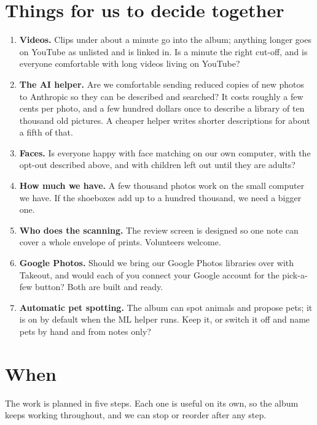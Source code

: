 \documentclass[11pt,a4paper]{article}
\begin{document}
\section{Things for us to decide together}

\begin{enumerate}[leftmargin=2em,itemsep=4pt]
  \item \textbf{Videos.} Clips under about a minute go into the album; anything longer goes on YouTube as unlisted and is linked in. Is a minute the right cut-off, and is everyone comfortable with long videos living on YouTube?
  \item \textbf{The AI helper.} Are we comfortable sending reduced copies of new photos to Anthropic so they can be described and searched? It costs roughly a few cents per photo, and a few hundred dollars once to describe a library of ten thousand old pictures. A cheaper helper writes shorter descriptions for about a fifth of that.
  \item \textbf{Faces.} Is everyone happy with face matching on our own computer, with the opt-out described above, and with children left out until they are adults?
  \item \textbf{How much we have.} A few thousand photos work on the small computer we have. If the shoeboxes add up to a hundred thousand, we need a bigger one.
  \item \textbf{Who does the scanning.} The review screen is designed so one note can cover a whole envelope of prints. Volunteers welcome.
  \item \textbf{Google Photos.} Should we bring our Google Photos libraries over with Takeout, and would each of you connect your Google account for the pick-a-few button? Both are built and ready.
  \item \textbf{Automatic pet spotting.} The album can spot animals and propose pets; it is on by default when the ML helper runs. Keep it, or switch it off and name pets by hand and from notes only?
\end{enumerate}


\section{When}

The work is planned in five steps. Each one is useful on its own, so the album keeps working throughout, and we can stop or reorder after any step.
\end{document}
